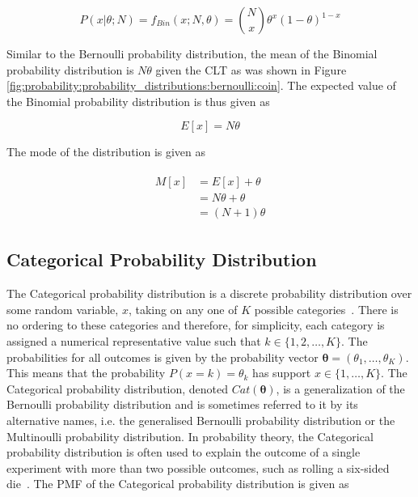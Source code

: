 \begin{equation}
      \label{eq:probability:probability_distributions:binomial:pmf}
      P(x \vert \theta; N) = f_{Bin}(x; N, \theta) = \binom{N}{x} \theta^{x}(1-\theta)^{1-x}
\end{equation}

Similar to the Bernoulli probability distribution, the mean of the Binomial probability distribution is $N\theta$ given the \acs{CLT} as was shown in Figure \ref{fig:probability:probability_distributions:bernoulli:coin}. The expected value of the Binomial probability distribution is thus given as

\begin{equation}
      \label{eq:probability:probability_distributions:binomial:expected_value}
      E[x] = N\theta
\end{equation}

The mode of the distribution is given as

\begin{align}
      \label{eq:probability:probability_distributions:binomial:mode}
      \begin{split}
            M[x] &= E[x] + \theta \\
            &= N\theta  + \theta \\
            &= (N  + 1)\theta
      \end{split}
\end{align}

\subsection{Categorical Probability Distribution}\label{sec:probability:probability_distributions:categorical}

The Categorical probability distribution is a discrete probability distribution over some random variable, $x$, taking on any one of $K$ possible categories~\cite{ref:wackerly:2014}. There is no ordering to these categories and therefore, for simplicity, each category is assigned a numerical representative value such that $k \in \{1, 2, \dots, K\}$. The probabilities for all outcomes is given by the probability vector $\boldsymbol{\theta} = (\theta_{1}, \dots, \theta_{K})$.  This means that the probability $P(x=k)=\theta_{k}$ has support $x \in \{1, \dots, K\}$. The Categorical probability distribution, denoted $Cat(\boldsymbol{\theta})$, is a generalization of the Bernoulli probability distribution and is sometimes referred to it by its alternative names, i.e. the generalised Bernoulli probability distribution or the Multinoulli probability distribution. In probability theory, the Categorical probability distribution is often used to explain the outcome of a single experiment with more than two possible outcomes, such as rolling a six-sided die~\cite{ref:wackerly:2014}. The \acs{PMF} of the Categorical probability distribution is given as

